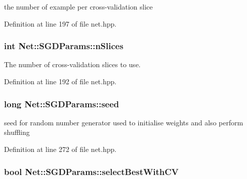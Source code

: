 the number of example per cross-\/validation slice 



Definition at line 197 of file net.\+hpp.

\subsubsection[{\texorpdfstring{n\+Slices}{nSlices}}]{\setlength{\rightskip}{0pt plus 5cm}int Net\+::\+S\+G\+D\+Params\+::n\+Slices}\hypertarget{structNet_1_1SGDParams_ad2881fd1737b7eca70fcc243b3d8f3e1}{}\label{structNet_1_1SGDParams_ad2881fd1737b7eca70fcc243b3d8f3e1}


The number of cross-\/validation slices to use. 



Definition at line 192 of file net.\+hpp.

\subsubsection[{\texorpdfstring{seed}{seed}}]{\setlength{\rightskip}{0pt plus 5cm}long Net\+::\+S\+G\+D\+Params\+::seed}\hypertarget{structNet_1_1SGDParams_a66a44dda4f26cb33c3f787383a2a493b}{}\label{structNet_1_1SGDParams_a66a44dda4f26cb33c3f787383a2a493b}


seed for random number generator used to initialise weights and also perform shuffling 



Definition at line 272 of file net.\+hpp.

\subsubsection[{\texorpdfstring{select\+Best\+With\+CV}{selectBestWithCV}}]{\setlength{\rightskip}{0pt plus 5cm}bool Net\+::\+S\+G\+D\+Params\+::select\+Best\+With\+CV}\hypertarget{structNet_1_1SGDParams_afc048bab4c4091714af1d1e8453a340f}{}\label{structNet_1_1SGDParams_afc048bab4c4091714af1d1e8453a340f}


